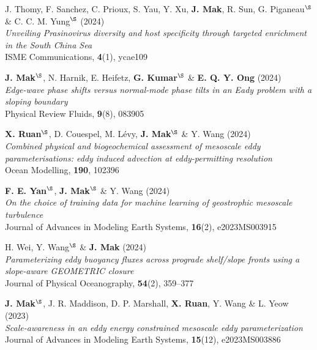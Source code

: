 \documentclass[letterpaper]{article}
\renewenvironment{itemize}{
  \begin{list}{}{
    \setlength{\leftmargin}{1.5em}
  }
}{
  \end{list}
}
\begin{document}
\begin{itemize}
\item[24.] J. Thomy, F. Sanchez, C. Prioux, S. Yau, Y. Xu, \textbf{J. Mak}, R. Sun, G. Piganeau$^{\S}$ \& C. C. M. Yung$^{\S}$ (2024)\\
\textit{Unveiling Prasinovirus diversity and host specificity through targeted enrichment in the South China Sea}\\
ISME Communications, \textbf{4}(1), ycae109

\item[23.] \textbf{J. Mak}$^{\S}$, N. Harnik, E. Heifetz, \textbf{G. Kumar}$^{\S}$ \& \textbf{E. Q. Y. Ong} (2024)\\
\textit{Edge-wave phase shifts versus normal-mode phase tilts in an Eady problem with a sloping boundary}\\
Physical Review Fluids, \textbf{9}(8), 083905

\item[22.] \textbf{X. Ruan}$^{\S}$, D. Couespel, M. L\'evy, \textbf{J. Mak}$^{\S}$ \& Y. Wang (2024)\\
\textit{Combined physical and biogeochemical assessment of mesoscale eddy parameterisations: eddy induced advection at eddy-permitting resolution}\\
Ocean Modelling, \textbf{190}, 102396

\item[21.] \textbf{F. E. Yan}$^{\S}$, \textbf{J. Mak}$^{\S}$ \& Y. Wang (2024)\\
\textit{On the choice of training data for machine learning of geostrophic mesoscale turbulence}\\
Journal of Advances in Modeling Earth Systems, \textbf{16}(2), e2023MS003915

\item[20.] H. Wei, Y. Wang$^{\S}$ \& \textbf{J. Mak} (2024)\\
\textit{Parameterizing eddy buoyancy fluxes across prograde shelf/slope fronts using a slope-aware GEOMETRIC closure}\\
Journal of Physical Oceanography, \textbf{54}(2), 359--377

\item[19.] \textbf{J. Mak}$^{\S}$, J. R. Maddison, D. P. Marshall, \textbf{X. Ruan}, Y. Wang \& L. Yeow (2023)\\
\textit{Scale-awareness in an eddy energy constrained mesoscale eddy parameterization}\\
Journal of Advances in Modeling Earth Systems, \textbf{15}(12), e2023MS003886


\end{itemize}
\end{document}
